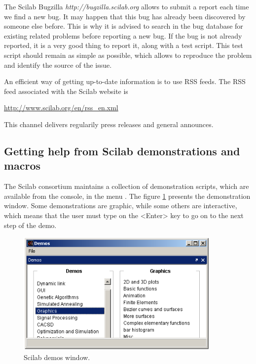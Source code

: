 The Scilab Bugzilla \emph{http://bugzilla.scilab.org} allows to submit 
a report each time we find a new bug. It may happen that this bug has already been
discovered by someone else before. This is why it is advised to search in the bug 
database for existing related problems before reporting a new bug. If the 
bug is not already reported, it is a very good thing to report it, along 
with a test script. This test script should remain as simple as possible, 
which allows to reproduce the problem and identify the source of the issue.

An efficient way of getting up-to-date information is to use RSS feeds.
The RSS feed associated with the Scilab website is 
\begin{center}
\url{http://www.scilab.org/en/rss_en.xml}
\end{center}
This channel delivers regularily press releases and general 
announces.

\subsection{Getting help from Scilab demonstrations and macros}

The Scilab consortium maintains a collection of demonstration scripts,
which are available from the console, in the menu .
The figure \ref{fig-scilab-demos} presents the demonstration 
window. Some demonstrations are graphic, while some others 
are interactive, which means that the user must type on the 
<Enter> key to go on to the next step of the demo.

\begin{figure}
\begin{center}
\includegraphics[width=10cm]{introscilab/scilab-demos.png}
\end{center}
\caption{Scilab demos window.}
\label{fig-scilab-demos}
\end{figure}

